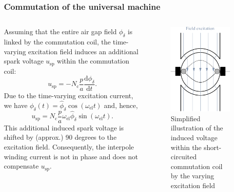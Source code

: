 \begin{frame}
	\frametitle{Commutation of the universal machine}
	\begin{columns}
		\begin{column}{0.65\textwidth}
		Assuming that the entire air gap field $\phi_\delta$ is linked by the commutation coil, the time-varying excitation field induces an additional spark voltage $u_\mathrm{sp}$ within the commutation coil:
		\begin{equation}
			u_\mathrm{sp} = -N_\mathrm{c} \frac{p}{a} \frac{\mathrm{d}\phi_\delta}{\mathrm{d}t}.
		\end{equation}
		\pause
		Due to the time-varying excitation current, we have $\phi_\delta(t) = \hat{\phi}_\delta\cos(\omega_\mathrm{el} t)$ and, hence,
		\begin{equation}
			u_\mathrm{sp} = N_\mathrm{c} \frac{p}{a} \omega_\mathrm{el} \hat{\phi}_\delta \sin(\omega_\mathrm{el} t).
			\label{eq:Induced_spark_voltage}
		\end{equation}
		\pause
		This additional induced spark voltage is shifted by (approx.) 90 degrees to the excitation field. Consequently, the interpole winding current is not in phase and does not compensate $u_\mathrm{sp}$.
\end{column}
\hfill
\begin{column}{0.35\textwidth}
	\onslide<1->
	\begin{figure}
		\centering
		\includegraphics[scale=1]{fig/lec03/Commutation_universal_machine.pdf}
		\caption{Simplified illustration of the induced voltage within the short-circuited commutation coil by the varying excitation field}
		\label{fig:Commutation_universal_machine}
\end{figure}
\end{column}
\end{columns}
\end{frame}

